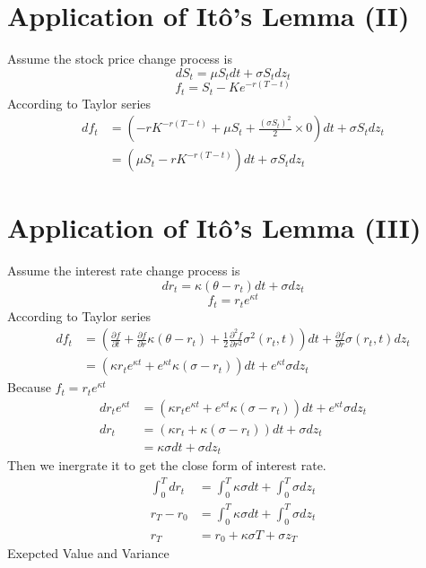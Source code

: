 \documentclass[12pt]{article}
\begin{document}
\section{Application of It\^o's Lemma (II)}
Assume the stock price change process is
\[
    dS_t = \mu S_t dt + \sigma S_t dz_t  
\]
\[
    f_t = S_t - Ke^{-r(T-t)}
\]  
According to Taylor series
\begin{align*}
    df_t &= (-rK^{-r(T-t)} + \mu S_t + \frac{(\sigma S_t)^2}{2}\times 0)dt + \sigma S_t dz_t\\
    &= (\mu S_t - rK^{-r(T-t)})dt + \sigma S_t dz_t
\end{align*}

\section{Application of It\^o's Lemma (III)}
Assume the interest rate change process is
\[
    dr_t = \kappa(\theta - r_t)dt + \sigma dz_t
\]
\[
    f_t = r_t e^{\kappa t}
\]  
According to Taylor series
\begin{align*}
    df_t &= (\frac{\partial f}{\partial t} + \frac{\partial f}{\partial r}\kappa(\theta-r_t) + \frac{1}{2}\frac{\partial^2f}{\partial r^2}\sigma^2(r_t, t))dt + \frac{\partial f}{\partial r}\sigma(r_t, t)dz_t\\
    &= (\kappa r_t e^{\kappa t} + e^{\kappa t}\kappa (\sigma-r_t))dt + e^{\kappa t}\sigma dz_t
\end{align*}
Because $f_t = r_t e^{\kappa t}$
\begin{align*}
    dr_t e^{\kappa t} &= (\kappa r_t e^{\kappa t} + e^{\kappa t}\kappa (\sigma-r_t))dt + e^{\kappa t}\sigma dz_t\\
    dr_t &= (\kappa r_t + \kappa (\sigma-r_t))dt + \sigma dz_t\\
    &= \kappa\sigma dt + \sigma dz_t
\end{align*}
Then we inergrate it to get the close form of interest rate.
\begin{align*}
    \int_0^T dr_t &= \int_0^T \kappa\sigma dt + \int_0^T \sigma dz_t\\
    r_T -r_0 &= \int_0^T \kappa\sigma dt + \int_0^T \sigma dz_t\\
    r_T &= r_0 + \kappa\sigma T + \sigma z_T
\end{align*}
Exepcted Value and Variance
\newpage
\end{document}
